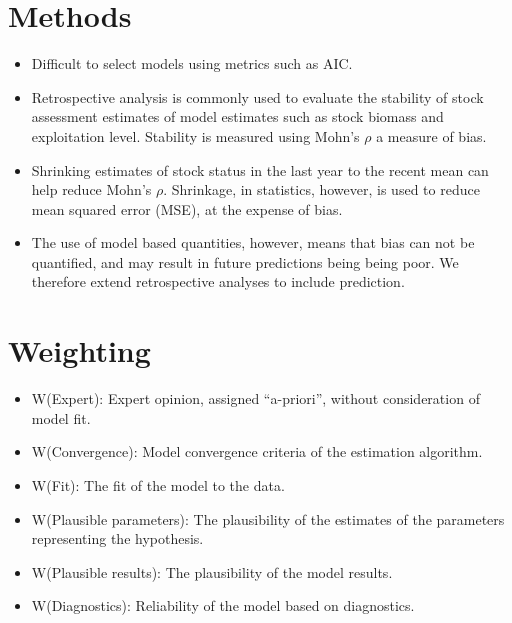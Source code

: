 \newpage
\section*{Methods}
\begin{itemize}
    \item Difficult to select models using metrics such as AIC. 
    \item Retrospective analysis is commonly used to evaluate the stability of stock assessment estimates of model estimates such as stock biomass and exploitation level. Stability is measured using Mohn's $\rho$ a measure of bias. 
    \item Shrinking estimates of stock status in the last year to the recent mean can help reduce Mohn's $\rho$. Shrinkage, in statistics, however, is used to reduce mean squared error (MSE), at the expense of bias. 
    \item The use of model based quantities, however, means that bias can not be quantified, and may result in future predictions being being poor. We therefore extend retrospective analyses to include prediction. 
\end{itemize}

\newpage


\clearpage
\newpage
\section*{Weighting}

\begin{itemize}
    \item W(Expert): Expert opinion, assigned “a-priori”, without consideration of model fit.
    \item W(Convergence): Model convergence criteria of the estimation algorithm.
    \item W(Fit): The fit of the model to the data.
    \item W(Plausible parameters): The plausibility of the estimates of the parameters representing the
hypothesis.
    \item W(Plausible results): The plausibility of the model results.
    \item W(Diagnostics): Reliability of the model based on diagnostics.
\end{itemize}

\clearpage
\newpage

%

\newpage\clearpage





